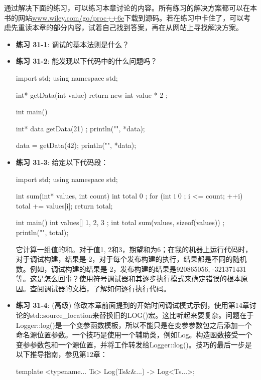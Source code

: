 通过解决下面的练习，可以练习本章讨论的内容。所有练习的解决方案都可以在本书的网站\url{www.wiley.com/go/proc++6e}下载到源码。若在练习中卡住了，可以考虑先重读本章的部分内容，试着自己找到答案，再在从网站上寻找解决方案。

\begin{itemize}
\item
\textbf{练习 31-1}: 调试的基本法则是什么？

\item
\textbf{练习 31-2}: 能发现以下代码中的什么问题吗？

\begin{cpp}
import std;
using namespace std;

int* getData(int value) { return new int { value * 2 }; }

int main()
{
    int* data { getData(21) };
    println("{}", *data);

    data = getData(42);
    println("{}", *data);
}
\end{cpp}

\item
\textbf{练习 31-3}: 给定以下代码段：

\begin{cpp}
import std;
using namespace std;

int sum(int* values, int count)
{
    int total { 0 };
    for (int i { 0 }; i <= count; ++i) { total += values[i]; }
    return total;
}

int main()
{
    int values[] { 1, 2, 3 };
    int total { sum(values, sizeof(values)) };
    println("{}", total);
}
\end{cpp}

它计算一组值的和。对于值1, 2和3，期望和为6；在我的机器上运行代码时，对于调试构建，结果是-2，对于每个发布构建的执行，结果都是不同的随机数。例如，调试构建的结果是-2，发布构建的结果是920865056, -321371431等。这是怎么回事？使用符号调试器和其逐步执行模式来确定错误的根本原因。查阅调试器的文档，了解如何逐行执行代码。

\item
\textbf{练习 31-4}: (高级) 修改本章前面提到的开始时间调试模式示例，使用第14章讨论的std::source\_location来替换旧的LOG()宏。这比听起来要复杂。问题在于Logger::log()是一个变参函数模板，所以不能只是在变参参数包之后添加一个命名源位置参数。一个技巧是使用一个辅助类，例如Log。构造函数接受一个变参参数包和一个源位置，并将工作转发给Logger::log()。技巧的最后一步是以下推导指南，参见第12章：

\begin{cpp}
template <typename... Ts>
Log(Ts&&...) -> Log<Ts...>;
\end{cpp}
\end{itemize}












